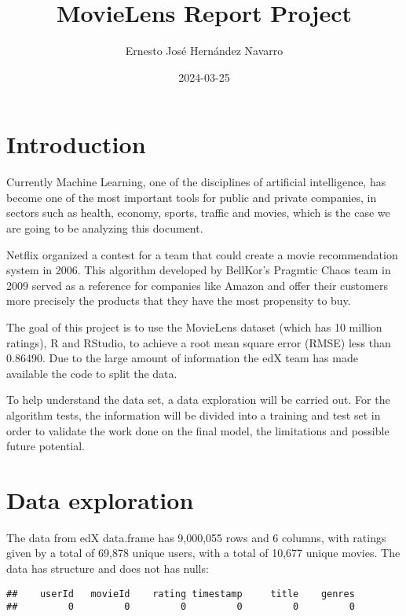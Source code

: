 \documentclass[
]{article}
\title{MovieLens Report Project}
\author{Ernesto José Hernández Navarro}
\date{2024-03-25}
\begin{document}
\maketitle

{
\setcounter{tocdepth}{2}
\tableofcontents
}
\hypertarget{introduction}{%
\section{Introduction}\label{introduction}}

Currently Machine Learning, one of the disciplines of artificial
intelligence, has become one of the most important tools for public and
private companies, in sectors such as health, economy, sports, traffic
and movies, which is the case we are going to be analyzing this
document.

Netflix organized a contest for a team that could create a movie
recommendation system in 2006. This algorithm developed by BellKor's
Pragmtic Chaos team in 2009 served as a reference for companies like
Amazon and offer their customers more precisely the products that they
have the most propensity to buy.

The goal of this project is to use the MovieLens dataset (which has 10
million ratings), R and RStudio, to achieve a root mean square error
(RMSE) less than 0.86490. Due to the large amount of information the edX
team has made available the code to split the data.

To help understand the data set, a data exploration will be carried out.
For the algorithm tests, the information will be divided into a training
and test set in order to validate the work done on the final model, the
limitations and possible future potential.

\hypertarget{data-exploration}{%
\section{Data exploration}\label{data-exploration}}

The data from edX data.frame has 9,000,055 rows and 6 columns, with
ratings given by a total of 69,878 unique users, with a total of 10,677
unique movies. The data has structure and does not has nulls:

\begin{verbatim}
##    userId   movieId    rating timestamp     title    genres 
##         0         0         0         0         0         0
\end{verbatim}
\end{document}
